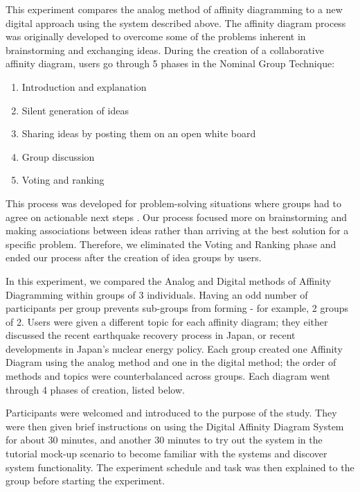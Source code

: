 \documentclass{sigchi}
\begin{document}
This experiment compares the analog method of affinity diagramming to a new digital approach using the system described above. The affinity diagram process was originally developed to overcome some of the problems inherent in brainstorming and exchanging ideas\cite{kawakita1991original}. During the creation of a collaborative affinity diagram, users go through 5 phases in the Nominal Group Technique:  
\begin{enumerate}
\item Introduction and explanation
\item Silent generation of ideas
\item Sharing ideas by posting them on an open white board
\item Group discussion
\item Voting and ranking
\end{enumerate}
This process was developed for problem-solving situations where groups had to agree on actionable next steps \cite{delbecq1971group,gallagher1993nominal}. Our process focused more on brainstorming and making associations between ideas rather than arriving at the best solution for a specific problem. Therefore, we eliminated the Voting and Ranking phase and ended our process after the creation of idea groups by users.

In this experiment, we compared the Analog and Digital methods of Affinity Diagramming within groups of 3 individuals. Having an odd number of participants per group prevents sub-groups from forming - for example, 2 groups of 2. Users were given a different topic for each affinity diagram; they either discussed the recent earthquake recovery process in Japan, or recent developments in Japan's nuclear energy policy. Each group created one Affinity Diagram using the analog method and one in the digital method; the order of methods and topics were counterbalanced across groups. Each diagram went through 4 phases of creation, listed below.

Participants were welcomed and introduced to the purpose of the study. They were then given brief instructions on using the Digital Affinity Diagram System for about 30 minutes, and another 30 minutes to try out the system in the tutorial mock-up scenario to become familiar with the systems and discover system functionality. The experiment schedule and task was then explained to the group before starting the experiment. 
\end{document}
